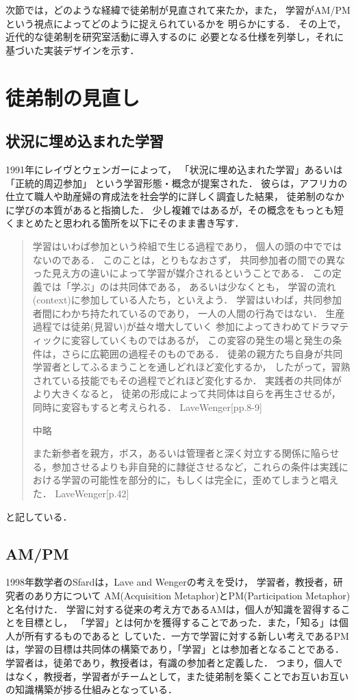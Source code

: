 \documentclass{hissymp}
\begin{document}
次節では，どのような経緯で徒弟制が見直されて来たか，また，
学習がAM/PMという視点によってどのように捉えられているかを
明らかにする．
その上で，近代的な徒弟制を研究室活動に導入するのに
必要となる仕様を列挙し，それに基づいた実装デザインを示す．

\section{徒弟制の見直し}
\label{sec:org3ddde17}
\subsection{状況に埋め込まれた学習}
\label{sec:org090ba02}
1991年にレイヴとウェンガーによって，
  「状況に埋め込まれた学習」あるいは「正統的周辺参加」
  という学習形態・概念が提案された．
  彼らは，アフリカの仕立て職人や助産婦の育成法を社会学的に詳しく調査した結果，
  徒弟制のなかに学びの本質があると指摘した．
少し複雑ではあるが，その概念をもっとも短くまとめたと思われる箇所を以下にそのまま書き写す．
\begin{quote}
学習はいわば参加という枠組で生じる過程であり，
個人の頭の中でではないのである．
このことは，とりもなおさず，
共同参加者の間での異なった見え方の違いによって学習が媒介されるということである．
この定義では「学ぶ」のは共同体である，
あるいは少なくとも，
学習の流れ(context)に参加している人たち，といえよう．
学習はいわば，共同参加者間にわかち持たれているのであり，
一人の人間の行為ではない．
生産過程では徒弟(見習い)が益々増大していく
参加によってきわめてドラマティックに変容していくものではあるが，
この変容の発生の場と発生の条件は，さらに広範囲の過程そのものである．
徒弟の親方たち自身が共同学習者としてふるまうことを通しどれほど変化するか，
したがって，習熟されている技能でもその過程でどれほど変化するか．
実践者の共同体がより大きくなると，
徒弟の形成によって共同体は自らを再生させるが，
同時に変容もすると考えられる．
LaveWenger[pp.8-9]

中略

また新参者を親方，ボス，あるいは管理者と深く対立する関係に陥らせる，参加させるよりも非自発的に隷従させるなど，これらの条件は実践における学習の可能性を部分的に，もしくは完全に，歪めてしまうと唱えた．
 LaveWenger[p.42]
\end{quote}
と記している．

\subsection{AM/PM}
\label{sec:org47bba06}
1998年数学者のSfardは，Lave and Wengerの考えを受け，
学習者，教授者，研究者のあり方について
AM(Acquisition Metaphor)とPM(Participation Metaphor)と名付けた．
学習に対する従来の考え方であるAMは，個人が知識を習得することを目標とし，
「学習」とは何かを獲得することであった．また，「知る」は個人が所有するものであると
していた．一方で学習に対する新しい考えであるPMは，学習の目標は共同体の構築であり，「学習」とは参加者となることである．学習者は，徒弟であり，教授者は，有識の参加者と定義した．
つまり，個人ではなく，教授者，学習者がチームとして，また徒弟制を築くことでお互いお互いの知識構築が捗る仕組みとなっている．
\end{document}
